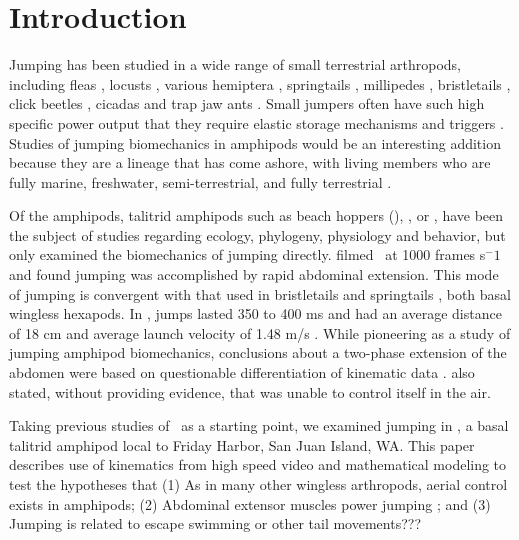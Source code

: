 \documentclass{jeb}
\newcommand{\Hyalepugettensis}{\Genus{Hyale pugettensis}}
\begin{document}
\maketitle

\section{Introduction}
Jumping has been studied in a wide range of small terrestrial arthropods, including fleas \citep{Bennet-Clark:1967},  locusts \citep{Bennet-Clark:1975}, various hemiptera \citep{Burrows:2006a, Burrows:2006, Burrows:2007, Burrows:2008, Burrows:2008a}, springtails \citep{Christian:1978}, millipedes \citep{Evans:1973}, bristletails \citep{Evans:1975}, click beetles \citep{Evans:1972, Makings:1973}, cicadas \citep{Gorb:2004} and trap jaw ants \citep{Gronenberg:1996, Patek:2006}.  Small jumpers often have such high specific power output that they require elastic storage mechanisms and triggers \citep{Bennet-Clark:1975a, Gronenberg:1996}.  Studies of jumping biomechanics in amphipods would be an interesting addition because they are a lineage that has come ashore, with living members who are fully marine, freshwater, semi-terrestrial, and fully terrestrial \citep{Hurley:1968, Spicer:1987}.  

Of the amphipods, talitrid amphipods such as beach hoppers (), , or , have been the subject of studies regarding ecology, phylogeny, physiology and behavior, but only \citet{Bracht:1980} examined the biomechanics of jumping directly.  \citet{Bracht:1980} filmed \ at 1000 frames s$^-1$ and found jumping was accomplished by rapid abdominal extension.  This mode of jumping is convergent with that used in bristletails \citep{Evans:1975} and springtails \citep{Christian:1978}, both basal wingless hexapods.  In , jumps lasted 350 to 400 ms and had an average distance of 18 cm and average launch velocity of 1.48 m/s \citep{Bracht:1980}.  While pioneering as a study of jumping amphipod biomechanics, conclusions about a two-phase extension of the abdomen were based on questionable differentiation of kinematic data \citep{Crenshaw:2000}.  \citet{Bracht:1980} also stated, without providing evidence, that  was unable to control itself in the air.  
	
Taking previous studies of ~as a starting point, we examined jumping in \Hyalepugettensis, a basal talitrid amphipod local to Friday Harbor, San Juan Island, WA.  This paper describes use of kinematics from high speed video and mathematical modeling to test the hypotheses that (1) As in many other wingless arthropods, aerial control exists in amphipods; (2) Abdominal extensor muscles power jumping \citep{Bracht:1980}; and (3) Jumping is related to escape swimming or other tail movements??? 
\end{document}
